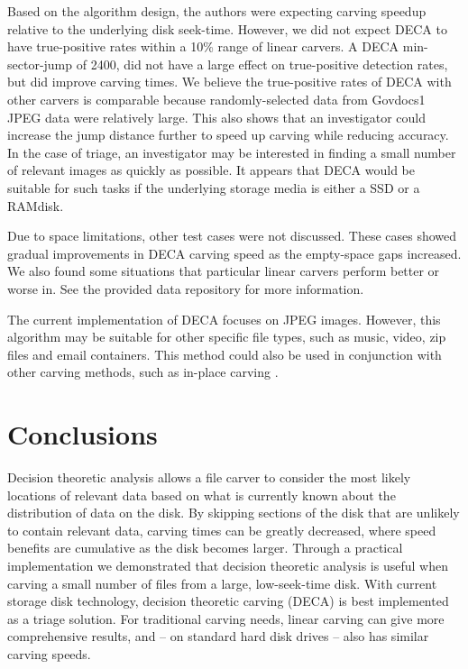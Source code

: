 \documentclass[final,5p,times,twocolumn,authoryear]{elsarticle}
\begin{document}
Based on the algorithm design, the authors were expecting carving speedup relative to the underlying disk seek-time. However, we did not expect DECA to have true-positive rates within a 10\% range of linear carvers. A DECA min-sector-jump of 2400, did not have a large effect on true-positive detection rates, but did improve carving times. We believe the true-positive rates of DECA with other carvers is comparable because randomly-selected data from Govdocs1 JPEG data were relatively large. This also shows that an investigator could increase the jump distance further to speed up carving while reducing accuracy. In the case of triage, an investigator may be interested in finding a small number of relevant images as quickly as possible. It appears that DECA would be suitable for such tasks if the underlying storage media is either a SSD or a RAMdisk.

Due to space limitations, other test cases were not discussed. These cases showed gradual improvements in DECA carving speed as the empty-space gaps increased. We also found some situations that particular linear carvers perform better or worse in. See the provided data repository for more information.

The current implementation of DECA focuses on JPEG images. However, this algorithm may be suitable for other specific file types, such as music, video, zip files and email containers. This method could also be used in conjunction with other carving methods, such as in-place carving \citep{Richard2007inplace, MeijerRob2012}.

\section{Conclusions}
Decision theoretic analysis allows a file carver to consider the most likely locations of relevant data based on what is currently known about the distribution of data on the disk. By skipping sections of the disk that are unlikely to contain relevant data, carving times can be greatly decreased, where speed benefits are cumulative as the disk becomes larger. Through a practical implementation we demonstrated that decision theoretic analysis is useful when carving a small number of files from a large, low-seek-time disk. With current storage disk technology, decision theoretic carving (DECA) is best implemented as a triage solution. For traditional carving needs, linear carving can give more comprehensive results, and  -- on standard hard disk drives -- also has similar carving speeds.
\end{document}
